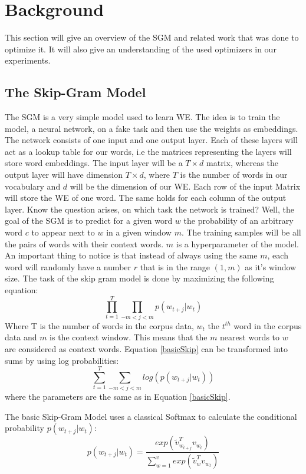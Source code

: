 \chapter{Background}\label{chap:background}
This section will give an overview of the SGM and related work that was done to optimize it. It will also give an understanding of the used optimizers in our experiments. 
\section{The Skip-Gram Model}
The SGM is a very simple model used to learn WE. The idea is to train the model, a neural network, on a fake task and then use the weights as embeddings. The network consists of one input and one output layer. Each of these layers will act as a lookup table for our words, i.e the matrices representing the layers will store word embeddings. The input layer will be a $T \times d$ matrix, whereas the output layer will have dimension $T \times d$, where $T$ is the number of words in our vocabulary and $d$ will be the dimension of our WE. Each row of the input Matrix will store the WE of one word. The same holds for each column of the output layer. Know the question arises, on which task the network is trained? Well, the goal of the SGM is to predict for a given word $w$ the probability of an arbitrary word $c$ to appear next to $w$ in a given window $m$. 
The training samples will be all the pairs of words with their context words. 
$m$ is a hyperparameter of the model. An important thing to notice is that instead of always using the same $m$, each word will randomly have a number $r$ that is in the range $(1,m)$ as it's window size.
The task of the skip gram model is done by maximizing the following equation:
\begin{equation} \label{basicSkip} \prod_{t=1}^T \prod_{-m<j<m}  p(w_{t+j}|w_t) \end{equation} Where T is the number of words in the corpus data, $w_t$ the $t^{th}$ word in the corpus data and $m$ is the context window. This means that the $m$ nearest words to $w$ are considered as context words.
Equation \ref{basicSkip} can be transformed into sums by using log probabilities: 
\begin{equation} \sum _{t=1}^T \sum_{-m<j<m} log( p(w_{t+j}|w_t) )\end{equation} 
    where the parameters are the same as in Equation \ref{basicSkip}.

The basic Skip-Gram Model uses a classical Softmax to calculate the conditional probability $p(w_{t+j}|w_t)$: 
   \begin{equation}
   p(w_{t+j}|w_t)=  \frac{exp( \tilde{v}_{w_{t+j}}^Tv_{w_t})}{\sum_{w=1}^v exp(\tilde{v}_w^Tv_{ w_t})}
   \end{equation}\label{eq:softmax}
  

